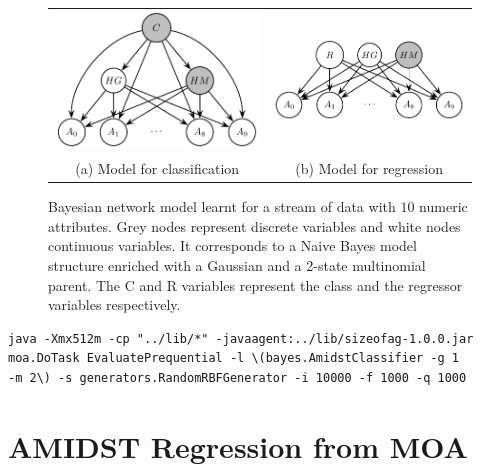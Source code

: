 \begin{figure}[htb]
   \centering
   \begin{tabular}{cc}
	\includegraphics[scale=0.8]{figs/HODE}&
	\includegraphics[scale=0.8]{figs/regressionHODE}\\
	(a) Model for classification & (b) Model for regression \\
	\end{tabular}
\caption{Bayesian network model learnt for a stream of data with $10$ numeric attributes. Grey nodes represent discrete variables and white nodes continuous variables. It corresponds to a Naive Bayes model structure enriched with a Gaussian and a 2-state multinomial parent. The C and R variables represent the class and the regressor variables respectively.}
\label{fig:HODE}
\end{figure}

\begin{verbatim}
java -Xmx512m -cp "../lib/*" -javaagent:../lib/sizeofag-1.0.0.jar 
moa.DoTask EvaluatePrequential -l \(bayes.AmidstClassifier -g 1 
-m 2\) -s generators.RandomRBFGenerator -i 10000 -f 1000 -q 1000
\end{verbatim}

\section{AMIDST Regression from MOA}

